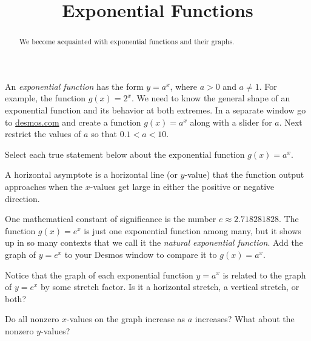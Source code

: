 \documentclass{ximera}
\title{Exponential Functions}
\begin{document}
\begin{abstract}
We become acquainted with exponential functions and their graphs.
\end{abstract}
\maketitle


An \emph{exponential function} has the form $y=a^x$, where $a>0$ and $a\ne1$. For example, the function $g(x)=2^x$. We need to know the general shape of an exponential function and its behavior at both extremes. In a separate window go to \url{desmos.com} and create a function $g(x)=a^x$ along with a slider for $a$. Next restrict the values of $a$ so that $0.1<a<10$.

\begin{question}
Select each true statement below about the exponential function $g(x)=a^x$.
  \begin{solution}
    \begin{multiple-choice}
    \end{multiple-choice}
    \begin{hint}
      A horizontal asymptote is a horizontal line (or $y$-value) that the function output approaches when the $x$-values get large in either the positive or negative direction.
    \end{hint}
  \end{solution}
\end{question}


One mathematical constant of significance is the number $e\approx2.718281828$. The function $g(x)=e^x$ is just one exponential function among many, but it shows up in so many contexts that we call it the \emph{natural exponential function}. Add the graph of $y=e^x$ to your Desmos window to compare it to $g(x)=a^x$.

\begin{question}
Notice that the graph of each exponential function $y=a^x$ is related to the graph of $y=e^x$ by some stretch factor. Is it a horizontal stretch, a vertical stretch, or both? 
  \begin{solution}
    \begin{multiple-choice}
    \end{multiple-choice}
    \begin{hint}
      Do all nonzero $x$-values on the graph increase as $a$ increases? What about the nonzero $y$-values?
    \end{hint}
  \end{solution}
\end{question}
\end{document}
